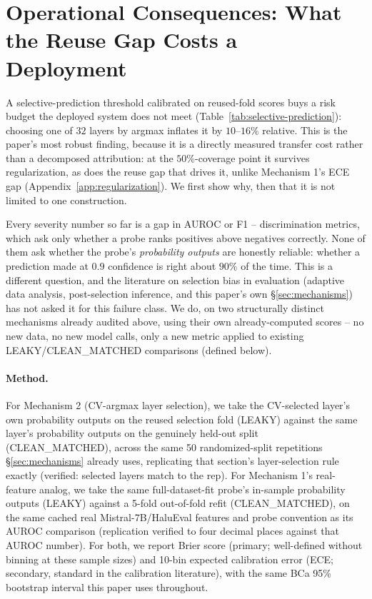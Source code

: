 \documentclass{article}
\begin{document}
\section{Operational Consequences: What the Reuse Gap Costs a Deployment}
\label{sec:calibration-bridge}

A selective-prediction threshold calibrated on reused-fold scores buys a risk
budget the deployed system does not meet
(Table~\ref{tab:selective-prediction}): choosing one of $32$ layers by argmax
inflates it by $10$--$16\%$ relative. This is the paper's most robust finding,
because it is a directly measured transfer cost rather than a decomposed
attribution: at the $50\%$-coverage point it survives regularization, as does
the reuse gap that drives it, unlike Mechanism 1's ECE gap
(Appendix~\ref{app:regularization}). We first show why, then that it is not
limited to one construction.


Every severity number so far is a gap in AUROC or F1 -- discrimination
metrics, which ask only whether a probe ranks positives above negatives
correctly. None of them ask whether the probe's \emph{probability outputs}
are honestly reliable: whether a prediction made at $0.9$ confidence is
right about $90\%$ of the time. This is a different question, and the
literature on selection bias in evaluation (adaptive data analysis,
post-selection inference, and this paper's own \S\ref{sec:mechanisms}) has
not asked it for this failure class. We do, on two structurally distinct
mechanisms already audited above, using their own already-computed scores --
no new data, no new model calls, only a new metric applied to existing
LEAKY/CLEAN\_MATCHED comparisons (defined below).

\paragraph{Method.} For Mechanism 2 (CV-argmax layer selection), we take the
CV-selected layer's own probability outputs on the reused selection fold
(LEAKY) against the same layer's probability outputs on the genuinely
held-out split (CLEAN\_MATCHED), across the same 50 randomized-split
repetitions \S\ref{sec:mechanisms} already uses, replicating that section's
layer-selection rule exactly (verified: selected layers match to the rep).
For Mechanism 1's real-feature analog, we take the same full-dataset-fit
probe's in-sample probability outputs (LEAKY) against a 5-fold
out-of-fold refit (CLEAN\_MATCHED), on the same cached real Mistral-7B/HaluEval
features and probe convention as its AUROC comparison (replication verified
to four decimal places against that AUROC number). For both, we report Brier
score (primary; well-defined without binning at these sample sizes) and
10-bin expected calibration error (ECE; secondary, standard in the
calibration literature), with the same BCa 95\% bootstrap interval this
paper uses throughout.
\end{document}

